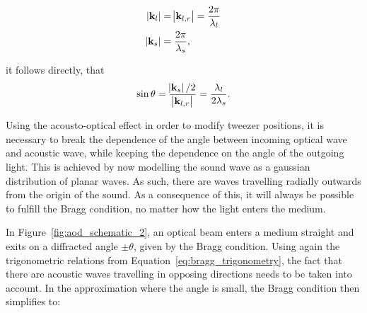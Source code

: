 \begin{align}
	\abs{\mathbf{k}_l} &= \abs{\mathbf{k}_{l,r}} = \frac{2\pi}{\lambda_l} \\
	\abs{\mathbf{k}_s} &= \frac{2\pi}{\lambda_s},
\end{align}

it follows directly, that
\begin{align}
	\label{eq:bragg_trigonometry}
	\sin{\theta} = \frac{\abs{\mathbf{k}_s} / 2}{\abs{\mathbf{k}_{l,r}}} = \frac{\lambda_l}{2\lambda_s}.
\end{align}

\begin{figure}[t]
\end{figure}



Using the acousto-optical effect in order to modify tweezer positions, it is necessary to break the dependence of the angle between incoming optical wave and acoustic wave, while keeping the dependence on the angle of the outgoing light. This is achieved by now modelling the sound wave as a gaussian distribution of planar waves. As such, there are waves travelling radially outwards from the origin of the sound. As a consequence of this, it will always be possible to fulfill the Bragg condition, no matter how the light enters the medium.

In Figure~\ref{fig:aod_schematic_2}, an optical beam enters a medium straight and exits on a diffracted angle $\pm \theta$, given by the Bragg condition. Using again the trigonometric relations from Equation~\ref{eq:bragg_trigonometry}, the fact that there are acoustic waves travelling in opposing directions needs to be taken into account. In the approximation where the angle is small, the Bragg condition then simplifies to:

